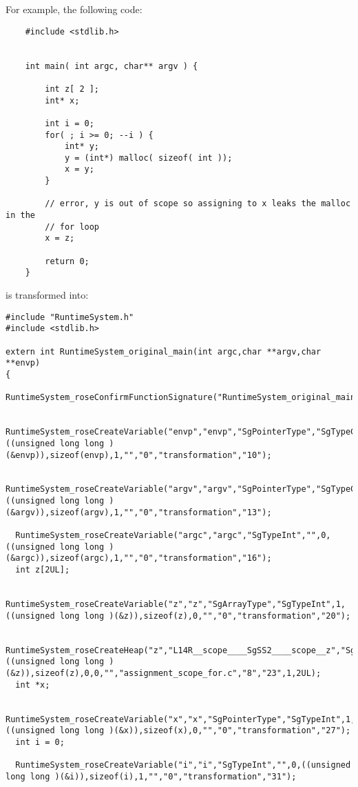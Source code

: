 For example, the following code:
\begin{verbatim}
    #include <stdlib.h>


    int main( int argc, char** argv ) {

        int z[ 2 ];
        int* x;

        int i = 0;
        for( ; i >= 0; --i ) {
            int* y;
            y = (int*) malloc( sizeof( int ));
            x = y;
        }

        // error, y is out of scope so assigning to x leaks the malloc in the
        // for loop
        x = z;

        return 0;
    }
\end{verbatim}

is transformed into:

\begin{verbatim}
#include "RuntimeSystem.h"
#include <stdlib.h>

extern int RuntimeSystem_original_main(int argc,char **argv,char **envp)
{
  RuntimeSystem_roseConfirmFunctionSignature("RuntimeSystem_original_main",3,"SgTypeInt","",0,"SgTypeInt","",0,"SgPointerType","SgTypeChar",2);
  
  RuntimeSystem_roseCreateVariable("envp","envp","SgPointerType","SgTypeChar",2,((unsigned long long )(&envp)),sizeof(envp),1,"","0","transformation","10");
  
  RuntimeSystem_roseCreateVariable("argv","argv","SgPointerType","SgTypeChar",2,((unsigned long long )(&argv)),sizeof(argv),1,"","0","transformation","13");
  
  RuntimeSystem_roseCreateVariable("argc","argc","SgTypeInt","",0,((unsigned long long )(&argc)),sizeof(argc),1,"","0","transformation","16");
  int z[2UL];
  
  RuntimeSystem_roseCreateVariable("z","z","SgArrayType","SgTypeInt",1,((unsigned long long )(&z)),sizeof(z),0,"","0","transformation","20");
  
  RuntimeSystem_roseCreateHeap("z","L14R__scope____SgSS2____scope__z","SgArrayType","SgTypeInt",1,((unsigned long long )(&z)),sizeof(z),0,0,"","assignment_scope_for.c","8","23",1,2UL);
  int *x;
  
  RuntimeSystem_roseCreateVariable("x","x","SgPointerType","SgTypeInt",1,((unsigned long long )(&x)),sizeof(x),0,"","0","transformation","27");
  int i = 0;
  
  RuntimeSystem_roseCreateVariable("i","i","SgTypeInt","",0,((unsigned long long )(&i)),sizeof(i),1,"","0","transformation","31");
  

\end{verbatim}
